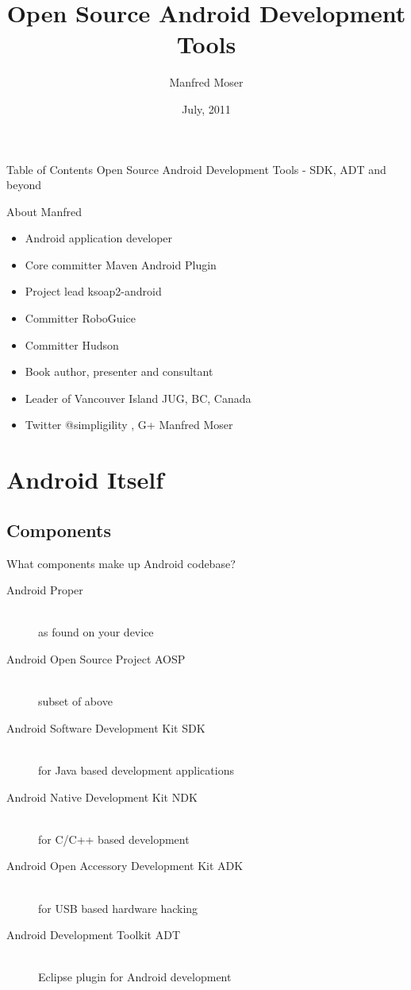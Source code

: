 \documentclass[aspectratio=169]{beamer}
\title{Open Source Android Development Tools}
\author{Manfred Moser}
\date{July, 2011}
\institute{simpligility.com}
\begin{document}
\begin{frame}
  \titlepage
\end{frame}

\begin{frame}{Table of Contents}
  Open Source Android Development Tools - SDK, ADT and beyond
  \setcounter{tocdepth}{1}
  \tableofcontents
\end{frame}

\begin{frame}{About Manfred}
  \begin{itemize}
    \item Android application developer
    \item Core committer Maven Android Plugin
    \item Project lead ksoap2-android
    \item Committer RoboGuice
    \item Committer Hudson
    \item Book author, presenter and consultant
    \item Leader of Vancouver Island JUG, BC, Canada
    \item Twitter @simpligility , G+ Manfred Moser
  \end{itemize}

\end{frame}


\section{Android Itself}

  \subsection{Components}
    \begin{frame}{What components make up Android codebase?}
      \begin{description}
        \item[Android Proper] \hfill \\ as found on your device
        \item[Android Open Source Project AOSP] \hfill  \\ subset of above 
        \item[Android Software Development Kit SDK] \hfill  \\ for Java based development applications
        \item[Android Native Development Kit NDK] \hfill  \\ for C/C++ based development
        \item[Android Open Accessory Development Kit ADK] \hfill \\ for USB based hardware hacking
        \item[Android Development Toolkit ADT] \hfill  \\ Eclipse plugin for Android development  
      \end{description}
    \end{frame}
\end{document}
